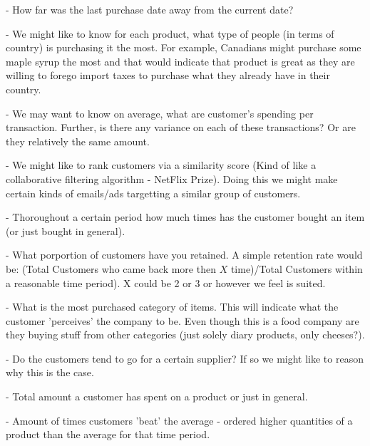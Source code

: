 \documentclass[11pt]{exam}
\begin{document}
\begin{questions}
\begin{solution}
{\vspace{3mm}

- How far was the last purchase date away from the current date?

\vspace{3mm}

- We might like to know for each product, what type of people (in terms of country) is purchasing it the most. For example, Canadians might purchase some maple syrup the most and that would indicate that product is great as they are willing to forego import taxes to purchase what they already have in their country.

\vspace{3mm}
- We may want to know on average, what are customer's spending per transaction. Further, is there any variance on each of these transactions? Or are they relatively the same amount.

\vspace{3mm}
- We might like to rank customers via a similarity score (Kind of like a collaborative filtering algorithm - NetFlix Prize). Doing this we might make certain kinds of emails/ads targetting a similar group of customers.

\vspace{3mm}

- Thoroughout a certain period how much times has the customer bought an item (or just bought in general).

\vspace{3mm}
- What porportion of customers have you retained. A simple retention rate would be: (Total Customers who came back more then $X$ time)/Total Customers within a reasonable time period). X could be 2 or 3 or however we feel is suited.

\vspace{3mm}
- What is the most purchased category of items. This will indicate what the customer 'perceives' the company to be. Even though this is a food company are they buying stuff from other categories (just solely diary products, only cheeses?).

\vspace{3mm}- Do the customers tend to go for a certain supplier? If so we might like to reason why this is the case.

\vspace{3mm} - Total amount a customer has spent on a product or just in general.


\vspace{3mm} - Amount of times customers 'beat' the average - ordered higher quantities of a product than the average for that time period.
}
\end{solution}


\end{questions}
\end{document}
